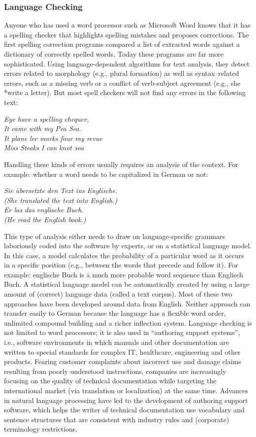 \documentclass[]{../metanetpaper}
\begin{document}
		\subsubsection{Language Checking}
Anyone who has used a word processor such as Microsoft Word knows that it has a spelling checker that highlights spelling mistakes and proposes corrections. The first spelling correction programs compared a list of extracted words against a dictionary of correctly spelled words. Today these programs are far more sophisticated. Using language-dependent algorithms for text analysis, they detect errors related to morphology (e.g., plural formation) as well as syntax–related errors, such as a missing verb or a conflict of verb-subject agreement (e.g., she *write a letter). But most spell checkers will not find any errors in the following text: 
\begin{center}

\textit{Eye have a spelling chequer,\\
It came with my Pea Sea.\\
It plane lee marks four my revue\\
Miss Steaks I can knot sea}
\end{center}	
Handling these kinds of errors usually requires an analysis of the context. For example: whether a word needs to be capitalized in German or not:
\begin{center}
\textit{Sie übersetzte den Text ins Englische.\\
(She translated the text into English.)\\
Er las das englische Buch.\\
(He read the English book.)}
\end{center}
This type of analysis either needs to draw on language-specific grammars laboriously coded into the software by experts, or on a statistical language model. In this case, a model calculates the probability of a particular word as it occurs in a specific position (e.g., between the words that precede and follow it). For example: englische Buch is a much more probable word sequence than Englisch Buch. A statistical language model can be automatically created by using a large amount of (correct) language data (called a text corpus). Most of these two approaches have been developed around data from English. Neither approach can transfer easily to German because the language has a flexible word order, unlimited compound building and a richer inflection system. 
Language checking is not limited to word processors; it is also used in “authoring support systems”, i.e., software environments in which manuals and other documentation are written to special standards for complex IT, healthcare, engineering and other products. Fearing customer complaints about incorrect use and damage claims resulting from poorly understood instructions, companies are increasingly focusing on the quality of technical documentation while targeting the international market (via translation or localization) at the same time. Advances in natural language processing have led to the development of authoring support software, which helps the writer of technical documentation use vocabulary and sentence structures that are consistent with industry rules and (corporate) terminology restrictions.
\end{document}
